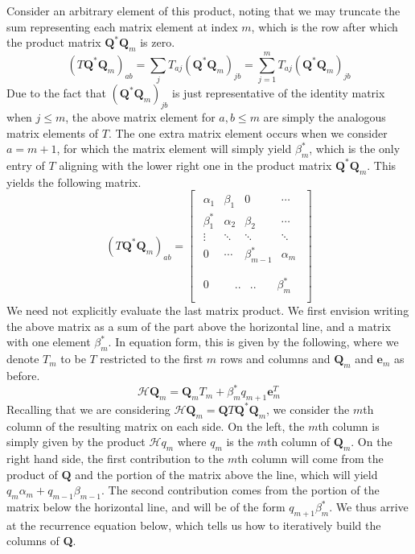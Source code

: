 \documentclass[12pt]{article} %
\begin{document}
Consider an arbitrary element of this product, noting that we may truncate the sum representing each matrix element at index $m$, which is the row after which the product matrix $\textbf{Q}^* \textbf{Q}_m$ is zero.
\begin{equation}
    (T\textbf{Q}^* \textbf{Q}_m)_{ab} = \sum_j T_{aj} (\textbf{Q}^*\textbf{Q}_m)_{jb} = \sum_{j=1}^m T_{aj} (\textbf{Q}^*\textbf{Q}_m)_{jb} 
\end{equation}
Due to the fact that $(\textbf{Q}^* \textbf{Q}_m)_{jb}$ is just representative of the identity matrix when $j \leq m$, the above matrix element for $a,b \leq m$ are simply the analogous matrix elements of $T$. The one extra matrix element occurs when we consider $a = m+1$, for which the matrix element will simply yield $\beta_m^*$, which is the only entry of $T$ aligning with the lower right one in the product matrix $\textbf{Q}^*\textbf{Q}_m$. This yields the following matrix.
\begin{equation}
(T \textbf{Q}^* \textbf{Q}_m)_{ab} = \begin{bmatrix}
\begin{array}{cccc}
\alpha_1 & \beta_1 & 0 & \cdots \\
\beta_1^* & \alpha_2 & \beta_2 & \cdots \\
\vdots & \ddots & \ddots & \ddots \\
0 & \cdots & \beta_{m-1}^* &\alpha_ m \\
\end{array}\\
\hline
\begin{array}{cccc}
0 \enspace \enspace \enspace& .. &.. & \enspace \; \;\beta_m^* \\
\end{array}
\end{bmatrix}
\end{equation}
We need not explicitly evaluate the last matrix product. We first envision writing the above matrix as a sum of the part above the horizontal line, and a matrix with one element $\beta_m^*$. In equation form, this is given by the following, where we denote $T_m$ to be $T$ restricted to the first $m$ rows and columns and $\textbf{Q}_m$ and $\textbf{e}_m$ as before. 
\begin{equation}
    \mathcal{H}\textbf{Q}_m = \textbf{Q}_m T_m + \beta_{m}^*q_{m+1}\textbf{e}^T_{m}
\end{equation}
Recalling that we are considering $\mathcal{H}\textbf{Q}_m = \textbf{Q} T \textbf{Q}^* \textbf{Q}_m$, we consider the $m$th column of the resulting matrix on each side. On the left, the $m$th column is simply given by the product $\mathcal{H}q_m$ where $q_m$ is the $m$th column of $\textbf{Q}_m$. On the right hand side, the first contribution to the $m$th column will come from the product of $\textbf{Q}$ and the portion of the matrix above the line, which will yield $q_m \alpha_m + q_{m-1} \beta_{m-1}$. The second contribution comes from the portion of the matrix below the horizontal line, and will be of the form $q_{m+1}\beta^*_m$. We thus arrive at the recurrence equation below, which tells us how to iteratively build the columns of \textbf{Q}.
\end{document}

